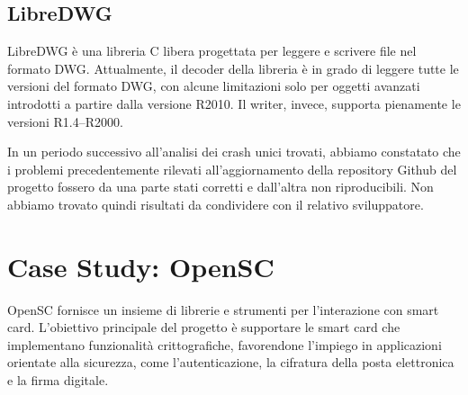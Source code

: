 \subsection{LibreDWG}

LibreDWG è una libreria C libera progettata per leggere e scrivere file nel formato DWG. Attualmente, il decoder della libreria è in grado di leggere tutte le versioni del formato DWG, con alcune limitazioni solo per oggetti avanzati introdotti a partire dalla versione R2010. Il writer, invece, supporta pienamente le versioni R1.4–R2000.

In un periodo successivo all'analisi dei crash unici trovati, abbiamo constatato che i problemi precedentemente rilevati all'aggiornamento della repository Github del progetto fossero da una parte stati corretti e dall'altra non riproducibili. 
Non abbiamo trovato quindi risultati da condividere con il relativo sviluppatore. 


\section{Case Study: OpenSC}

OpenSC fornisce un insieme di librerie e strumenti per l’interazione con smart card. L’obiettivo principale del progetto è supportare le smart card che implementano funzionalità crittografiche, favorendone l’impiego in applicazioni orientate alla sicurezza, come l’autenticazione, la cifratura della posta elettronica e la firma digitale.

